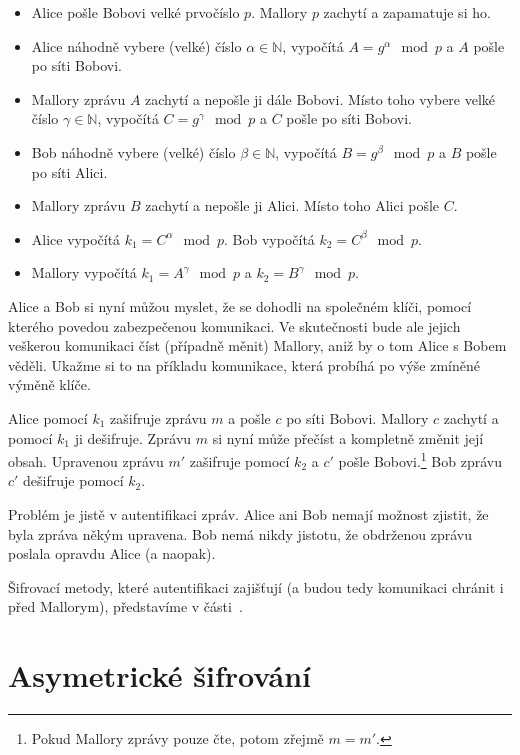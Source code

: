 \documentclass[
  program=infoi,
  biblatex,
  figures=false,
  glossaries,
  index
]{kidiplom}
\begin{document}
        \begin{itemize}
            \item
                Alice pošle Bobovi velké prvočíslo $p$.
                Mallory $p$ zachytí a zapamatuje si ho.
            \item
                Alice náhodně vybere (velké) číslo $\alpha \in \mathbb{N}$, vypočítá $A=g^\alpha \mod{p}$ a $A$ pošle po síti Bobovi.
            \item
                Mallory zprávu $A$ zachytí a nepošle ji dále Bobovi. Místo toho vybere velké číslo $\gamma \in \mathbb{N}$,
                vypočítá $C=g^\gamma \mod{p}$ a $C$ pošle po síti Bobovi.
            \item
                Bob náhodně vybere (velké) číslo $\beta \in \mathbb{N}$, vypočítá $B=g^\beta \mod{p}$ a $B$ pošle po síti Alici.
            \item
                Mallory zprávu $B$ zachytí a nepošle ji Alici. Místo toho Alici pošle $C$.
            \item
                Alice vypočítá $k_1=C^\alpha \mod{p}$. Bob vypočítá $k_2=C^\beta \mod{p}$.
            \item
                Mallory vypočítá $k_1=A^\gamma \mod{p}$ a $k_2=B^\gamma \mod{p}$.

        \end{itemize}


        Alice a Bob si nyní můžou myslet, že se dohodli na společném klíči, pomocí kterého povedou zabezpečenou komunikaci.
        Ve skutečnosti bude ale jejich veškerou komunikaci číst (případně měnit) Mallory, aniž by o tom Alice s Bobem věděli.
        Ukažme si to na příkladu komunikace, která probíhá po výše zmíněné výměně klíče.

        Alice pomocí $k_1$ zašifruje zprávu $m$ a pošle $c$ po síti Bobovi. Mallory $c$ zachytí a pomocí $k_1$ ji dešifruje.
        Zprávu $m$ si nyní může přečíst a kompletně změnit její obsah.
        Upravenou zprávu $m'$ zašifruje pomocí $k_2$ a $c'$ pošle Bobovi.\footnote{Pokud Mallory zprávy pouze čte, potom zřejmě $m = m'$.}
        Bob zprávu $c'$ dešifruje pomocí $k_2$.

        Problém je jistě v autentifikaci zpráv. Alice ani Bob nemají možnost zjistit, že byla zpráva někým upravena.
        Bob nemá nikdy jistotu, že obdrženou zprávu poslala opravdu Alice (a naopak).

        \medskip

        Šifrovací metody, které autentifikaci zajišťují (a budou tedy komunikaci chránit i před Mallorym), představíme v části~\ref{public-key}.

    \newpage
    
\part{Asymetrické šifrování}\label{public-key}
\end{document}
